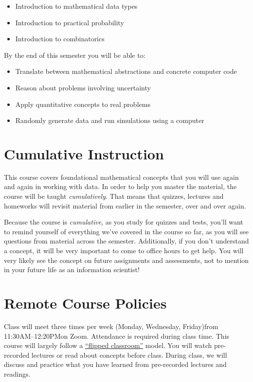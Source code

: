 \documentclass[10pt]{memoir}
\def\mymeetingdays{Monday, Wednesday, Friday}
\def\mymeetingtimes{11:30AM--12:20PM}
\begin{document}
\begin{itemize}
\item Introduction to mathematical data types
\item Introduction to practical probability
\item Introduction to combinatorics
\end{itemize}

By the end of this semester you will be able to:
\begin{itemize}
\item Translate between mathematical abstractions and concrete computer code
\item Reason about problems involving uncertainty
\item Apply quantitative concepts to real problems
\item Randomly generate data and run simulations using a computer
\end{itemize}

\section{\textbf{Cumulative Instruction}}

This course covers foundational mathematical concepts that you will use again and again in working with data. In order to help you master the material, the course will be taught \textit{cumulatively}. That means that quizzes, lectures and homeworks will revisit material from earlier in the semester, over and over again. 

Because the course is \textit{cumulative}, as you study for quizzes and tests, you'll want to remind yourself of everything we've covered in the course so far, as you will see questions from material across the semester. Additionally, if you don't understand a concept, it will be very important to come to office hours to get help. You will very likely see the concept on future assignments and assessments, not to mention in your future life as an information scientist!

\section{\textbf{Remote Course Policies}}
Class will meet three times per week (\mymeetingdays)\space from \mymeetingtimes\space on Zoom. {Attendance is required during class time.}  This course will largely follow a \href{https://en.wikipedia.org/wiki/Flipped_classroom}{``flipped classroom''}  model. You will watch pre-recorded lectures or read about concepts before class. During class, we will discuss and practice what you have learned from pre-recorded lectures and readings. 
\end{document}
